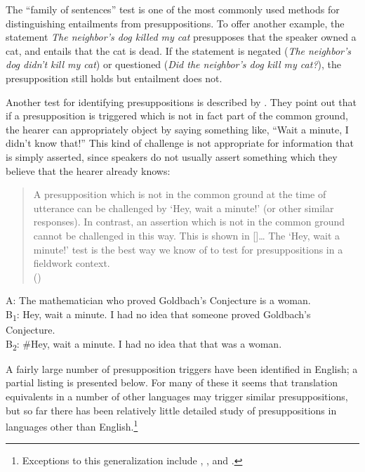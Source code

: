The “family of sentences” test is one of the most commonly used methods for distinguishing entailments from presuppositions. To offer another example, the statement \textit{The neighbor’s dog killed my cat} presupposes that the speaker owned a cat, and entails that the cat is dead. If the statement is negated (\textit{The neighbor’s dog didn’t kill my cat}) or questioned (\textit{Did the neighbor’s dog kill my cat?}), the presupposition still holds but entailment does not.



Another test for identifying presuppositions is described by  \citet{vonFintelMatthewson2008}. They point out that if a presupposition is triggered which is not in fact part of the common ground, the hearer can appropriately object by saying something like, “Wait a minute, I didn’t know that!” This kind of challenge is not appropriate for information that is simply asserted, since speakers do not usually assert something which they believe that the hearer already knows:


\begin{quote}
A presupposition which is not in the common ground at the time of utterance can be challenged by ‘Hey, wait a minute!’ (or other similar responses). In contrast, an assertion which is not in the common ground cannot be challenged in this way. This is shown in []… The ‘Hey, wait a minute!’ test is the best way we know of to test for presuppositions in a fieldwork context.\\
   (\citealt{vonFintelMatthewson2008})
\end{quote}

\ea \label{ex:3.13}
A: The mathematician who proved Goldbach’s Conjecture is a woman.\\
B\textsubscript{1}: Hey, wait a minute. I had no idea that someone proved Goldbach’s Conjecture.\\
B\textsubscript{2}: \#Hey, wait a minute. I had no idea that that was a woman.
\z


A fairly large number of presupposition triggers have been identified in English; a partial listing is presented below. For many of these it seems that translation equivalents in a number of other languages may trigger similar presuppositions, but so far there has been relatively little detailed study of presuppositions in languages other than English.\footnote{Exceptions to this generalization include \citet{LevinsonAnnamalai1992}, \citet{Matthewson2006}, and \citet{TonhauserEtAl2013}.}


